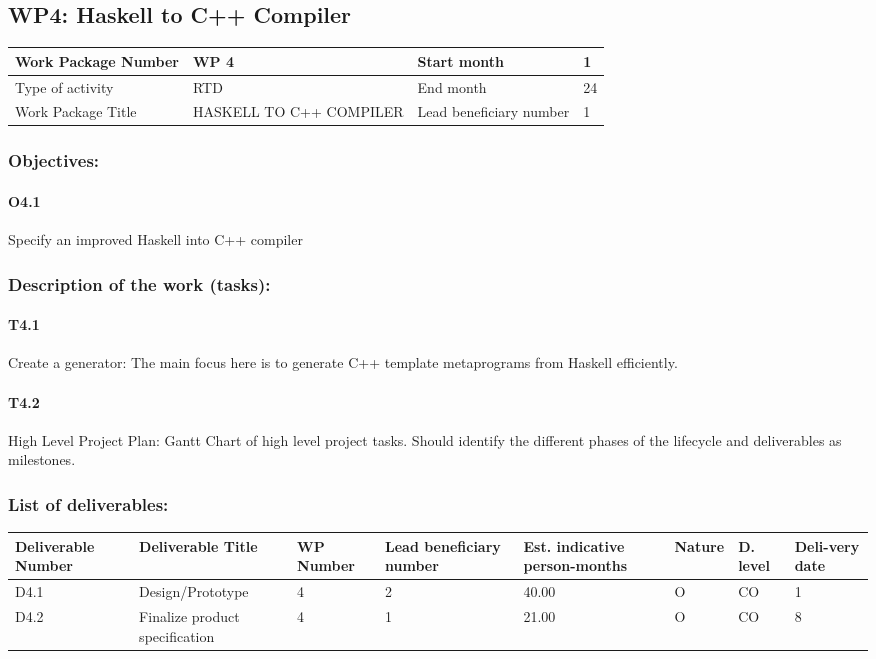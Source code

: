 \documentclass{article}
\begin{document}
\newpage
\subsection{WP4: Haskell to C++ Compiler}
 
\begin{center}
 	\begin{tabular}{ |p{3cm}|p{4cm}||p{2cm}|p{1cm}| }
 		\hline
 		Work Package Number & WP 4 & Start month & 1  \\ \hline
 		Type of activity & RTD & End month & 24 \\ \hline
 		Work Package Title & HASKELL TO C++ COMPILER & Lead beneficiary number & 1 \\ \hline
 	\end{tabular}
\end{center}

\subsubsection{Objectives:}
\paragraph{O4.1} Specify an improved Haskell into C++ compiler

\subsubsection{Description of the work (tasks):}
\paragraph{T4.1} Create a generator: The main focus here is to generate C++ template metaprograms from Haskell efficiently.
\paragraph{T4.2} High Level Project Plan: Gantt Chart of high level project tasks. Should identify the different phases of the lifecycle and deliverables as milestones. 

\subsubsection{List of deliverables:}
\begin{center}
	\begin{tabular}{ |p{1.6cm}|p{2cm}|p{0.8cm}|p{0.8cm}|p{0.9cm}|p{1cm}|p{0.5cm}|p{0.8cm}| }
		\hline
		Deliverable Number & Deliverable Title & WP Number & Lead beneficiary number & Est. indicative person-months & Nature & D. level & Deli-very date \\ \hline
		D4.1 & Design/Prototype  & 4 & 2 & 40.00 & O & CO & 1 \\ \hline
		D4.2 & Finalize product specification  & 4 & 1 & 21.00 & O & CO & 8 \\ \hline
	\end{tabular}
\end{center}
\end{document}
